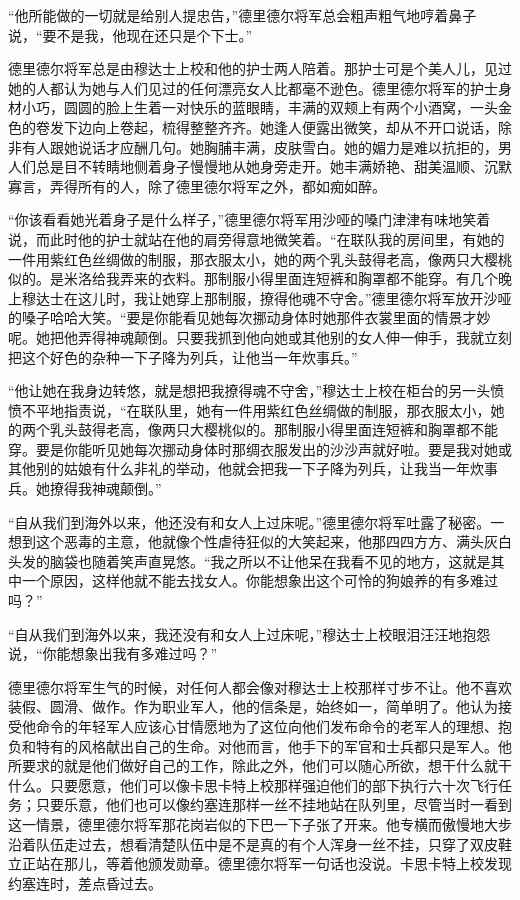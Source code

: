    “他所能做的一切就是给别人提忠告，”德里德尔将军总会粗声粗气地哼着鼻子说，“要不是我，他现在还只是个下士。”

    德里德尔将军总是由穆达士上校和他的护士两人陪着。那护士可是个美人儿，见过她的人都认为她与人们见过的任何漂亮女人比都毫不逊色。德里德尔将军的护士身材小巧，圆圆的脸上生着一对快乐的蓝眼睛，丰满的双颊上有两个小酒窝，一头金色的卷发下边向上卷起，梳得整整齐齐。她逢人便露出微笑，却从不开口说话，除非有人跟她说话才应酬几句。她胸脯丰满，皮肤雪白。她的媚力是难以抗拒的，男人们总是目不转睛地侧着身子慢慢地从她身旁走开。她丰满娇艳、甜美温顺、沉默寡言，弄得所有的人，除了德里德尔将军之外，都如痴如醉。

    “你该看看她光着身子是什么样子，”德里德尔将军用沙哑的嗓门津津有味地笑着说，而此时他的护士就站在他的肩旁得意地微笑着。“在联队我的房间里，有她的一件用紫红色丝绸做的制服，那衣服太小，她的两个乳头鼓得老高，像两只大樱桃似的。是米洛给我弄来的衣料。那制服小得里面连短裤和胸罩都不能穿。有几个晚上穆达士在这儿时，我让她穿上那制服，撩得他魂不守舍。”德里德尔将军放开沙哑的嗓子哈哈大笑。“要是你能看见她每次挪动身体时她那件衣裳里面的情景才妙呢。她把他弄得神魂颠倒。只要我抓到他向她或其他别的女人伸一伸手，我就立刻把这个好色的杂种一下子降为列兵，让他当一年炊事兵。”
 


    “他让她在我身边转悠，就是想把我撩得魂不守舍，”穆达士上校在柜台的另一头愤愤不平地指责说，“在联队里，她有一件用紫红色丝绸做的制服，那衣服太小，她的两个乳头鼓得老高，像两只大樱桃似的。那制服小得里面连短裤和胸罩都不能穿。要是你能听见她每次挪动身体时那绸衣服发出的沙沙声就好啦。要是我对她或其他别的姑娘有什么非礼的举动，他就会把我一下子降为列兵，让我当一年炊事兵。她撩得我神魂颠倒。”

    “自从我们到海外以来，他还没有和女人上过床呢。”德里德尔将军吐露了秘密。一想到这个恶毒的主意，他就像个性虐待狂似的大笑起来，他那四四方方、满头灰白头发的脑袋也随着笑声直晃悠。“我之所以不让他呆在我看不见的地方，这就是其中一个原因，这样他就不能去找女人。你能想象出这个可怜的狗娘养的有多难过吗？”

    “自从我们到海外以来，我还没有和女人上过床呢，”穆达士上校眼泪汪汪地抱怨说，“你能想象出我有多难过吗？”

    德里德尔将军生气的时候，对任何人都会像对穆达士上校那样寸步不让。他不喜欢装假、圆滑、做作。作为职业军人，他的信条是，始终如一，简单明了。他认为接受他命令的年轻军人应该心甘情愿地为了这位向他们发布命令的老军人的理想、抱负和特有的风格献出自己的生命。对他而言，他手下的军官和士兵都只是军人。他所要求的就是他们做好自己的工作，除此之外，他们可以随心所欲，想干什么就干什么。只要愿意，他们可以像卡思卡特上校那样强迫他们的部下执行六十次飞行任务；只要乐意，他们也可以像约塞连那样一丝不挂地站在队列里，尽管当时一看到这一情景，德里德尔将军那花岗岩似的下巴一下子张了开来。他专横而傲慢地大步沿着队伍走过去，想看清楚队伍中是不是真的有个人浑身一丝不挂，只穿了双皮鞋立正站在那儿，等着他颁发勋章。德里德尔将军一句话也没说。卡思卡特上校发现约塞连时，差点昏过去。

